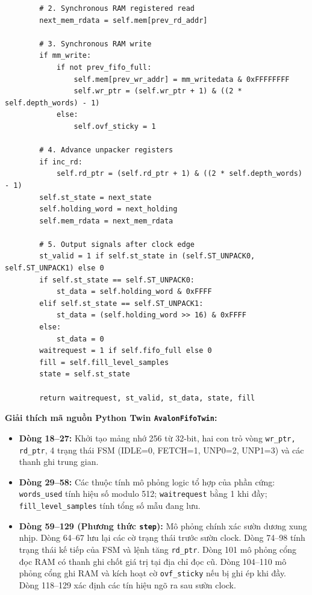 \begin{lstlisting}
        # 2. Synchronous RAM registered read
        next_mem_rdata = self.mem[prev_rd_addr]

        # 3. Synchronous RAM write
        if mm_write:
            if not prev_fifo_full:
                self.mem[prev_wr_addr] = mm_writedata & 0xFFFFFFFF
                self.wr_ptr = (self.wr_ptr + 1) & ((2 * self.depth_words) - 1)
            else:
                self.ovf_sticky = 1

        # 4. Advance unpacker registers
        if inc_rd:
            self.rd_ptr = (self.rd_ptr + 1) & ((2 * self.depth_words) - 1)
        self.st_state = next_state
        self.holding_word = next_holding
        self.mem_rdata = next_mem_rdata

        # 5. Output signals after clock edge
        st_valid = 1 if self.st_state in (self.ST_UNPACK0, self.ST_UNPACK1) else 0
        if self.st_state == self.ST_UNPACK0:
            st_data = self.holding_word & 0xFFFF
        elif self.st_state == self.ST_UNPACK1:
            st_data = (self.holding_word >> 16) & 0xFFFF
        else:
            st_data = 0
        waitrequest = 1 if self.fifo_full else 0
        fill = self.fill_level_samples
        state = self.st_state

        return waitrequest, st_valid, st_data, state, fill
\end{lstlisting}

\textbf{Giải thích mã nguồn Python Twin \texttt{AvalonFifoTwin}:}
\begin{itemize}[leftmargin=1.5em, itemsep=2pt]
    \item \textbf{Dòng 18--27:} Khởi tạo mảng nhớ 256 từ 32-bit, hai con trỏ vòng \texttt{wr\_ptr, rd\_ptr}, 4 trạng thái FSM (IDLE=0, FETCH=1, UNP0=2, UNP1=3) và các thanh ghi trung gian.
    \item \textbf{Dòng 29--58:} Các thuộc tính mô phỏng logic tổ hợp của phần cứng: \texttt{words\_used} tính hiệu số modulo 512; \texttt{waitrequest} bằng 1 khi đầy; \texttt{fill\_level\_samples} tính tổng số mẫu đang lưu.
    \item \textbf{Dòng 59--129 (Phương thức \texttt{step}):} Mô phỏng chính xác sườn dương xung nhịp. Dòng 64--67 lưu lại các cờ trạng thái trước sườn clock. Dòng 74--98 tính trạng thái kế tiếp của FSM và lệnh tăng \texttt{rd\_ptr}. Dòng 101 mô phỏng cổng đọc RAM có thanh ghi chốt giá trị tại địa chỉ đọc cũ. Dòng 104--110 mô phỏng cổng ghi RAM và kích hoạt cờ \texttt{ovf\_sticky} nếu bị ghi ép khi đầy. Dòng 118--129 xác định các tín hiệu ngõ ra sau sườn clock.
\end{itemize}

